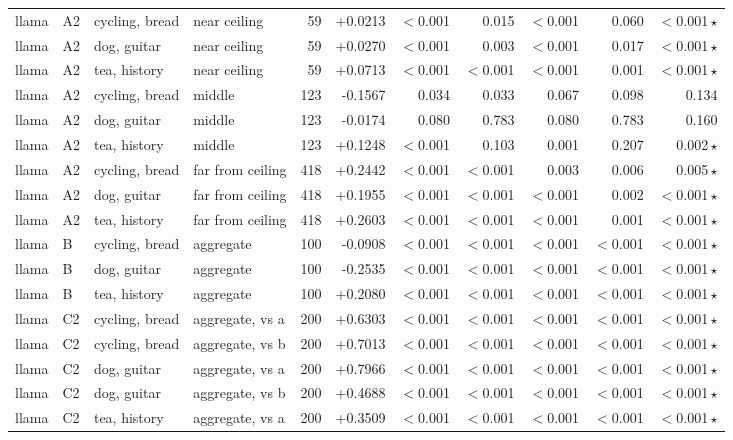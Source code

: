 \begin{center}
\begin{longtable}{llllrrrrrrr}
llama & A2 & cycling, bread & near ceiling & 59 & +0.0213 & $<$0.001 & 0.015 & $<$0.001 & 0.060 & $<$0.001\,$\star$ \\
llama & A2 & dog, guitar & near ceiling & 59 & +0.0270 & $<$0.001 & 0.003 & $<$0.001 & 0.017 & $<$0.001\,$\star$ \\
llama & A2 & tea, history & near ceiling & 59 & +0.0713 & $<$0.001 & $<$0.001 & $<$0.001 & 0.001 & $<$0.001\,$\star$ \\
llama & A2 & cycling, bread & middle & 123 & -0.1567 & 0.034 & 0.033 & 0.067 & 0.098 & 0.134 \\
llama & A2 & dog, guitar & middle & 123 & -0.0174 & 0.080 & 0.783 & 0.080 & 0.783 & 0.160 \\
llama & A2 & tea, history & middle & 123 & +0.1248 & $<$0.001 & 0.103 & 0.001 & 0.207 & 0.002\,$\star$ \\
llama & A2 & cycling, bread & far from ceiling & 418 & +0.2442 & $<$0.001 & $<$0.001 & 0.003 & 0.006 & 0.005\,$\star$ \\
llama & A2 & dog, guitar & far from ceiling & 418 & +0.1955 & $<$0.001 & $<$0.001 & $<$0.001 & 0.002 & $<$0.001\,$\star$ \\
llama & A2 & tea, history & far from ceiling & 418 & +0.2603 & $<$0.001 & $<$0.001 & $<$0.001 & 0.001 & $<$0.001\,$\star$ \\
llama & B & cycling, bread & aggregate & 100 & -0.0908 & $<$0.001 & $<$0.001 & $<$0.001 & $<$0.001 & $<$0.001\,$\star$ \\
llama & B & dog, guitar & aggregate & 100 & -0.2535 & $<$0.001 & $<$0.001 & $<$0.001 & $<$0.001 & $<$0.001\,$\star$ \\
llama & B & tea, history & aggregate & 100 & +0.2080 & $<$0.001 & $<$0.001 & $<$0.001 & $<$0.001 & $<$0.001\,$\star$ \\
llama & C2 & cycling, bread & aggregate, vs a & 200 & +0.6303 & $<$0.001 & $<$0.001 & $<$0.001 & $<$0.001 & $<$0.001\,$\star$ \\
llama & C2 & cycling, bread & aggregate, vs b & 200 & +0.7013 & $<$0.001 & $<$0.001 & $<$0.001 & $<$0.001 & $<$0.001\,$\star$ \\
llama & C2 & dog, guitar & aggregate, vs a & 200 & +0.7966 & $<$0.001 & $<$0.001 & $<$0.001 & $<$0.001 & $<$0.001\,$\star$ \\
llama & C2 & dog, guitar & aggregate, vs b & 200 & +0.4688 & $<$0.001 & $<$0.001 & $<$0.001 & $<$0.001 & $<$0.001\,$\star$ \\
llama & C2 & tea, history & aggregate, vs a & 200 & +0.3509 & $<$0.001 & $<$0.001 & $<$0.001 & $<$0.001 & $<$0.001\,$\star$ \\

\end{longtable}
\end{center}
